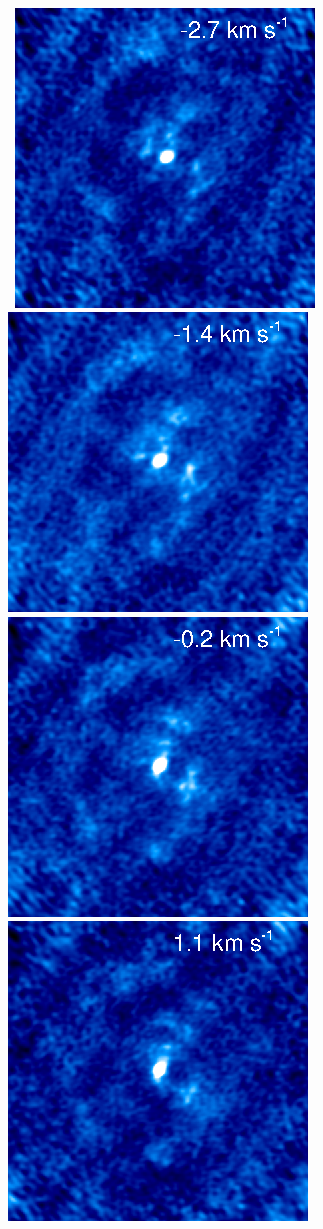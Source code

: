 \documentclass[preprint2]{aastex}
\begin{document}
\begin{figure}[hbt!]
{         }
\\
\mbox{
          \includegraphics[]{chan29.ps}
          \includegraphics[]{chan28.ps}
          \includegraphics[]{chan27.ps}
          \includegraphics[]{chan26.ps}
}
\end{figure}
\end{document}
